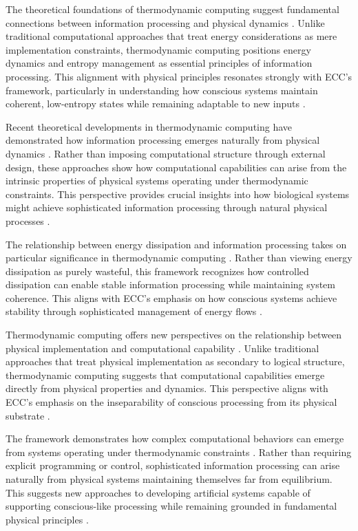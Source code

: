 \begin{refsection}
The theoretical foundations of thermodynamic computing suggest fundamental connections between information processing and physical dynamics \cite{Boyd2020}. Unlike traditional computational approaches that treat energy considerations as mere implementation constraints, thermodynamic computing positions energy dynamics and entropy management as essential principles of information processing. This alignment with physical principles resonates strongly with ECC's framework, particularly in understanding how conscious systems maintain coherent, low-entropy states while remaining adaptable to new inputs \cite{England2018}.

Recent theoretical developments in thermodynamic computing have demonstrated how information processing emerges naturally from physical dynamics \cite{Ganesh2021}. Rather than imposing computational structure through external design, these approaches show how computational capabilities can arise from the intrinsic properties of physical systems operating under thermodynamic constraints. This perspective provides crucial insights into how biological systems might achieve sophisticated information processing through natural physical processes \cite{Hinrichsen2019}.

The relationship between energy dissipation and information processing takes on particular significance in thermodynamic computing \cite{Kolchinsky2020}. Rather than viewing energy dissipation as purely wasteful, this framework recognizes how controlled dissipation can enable stable information processing while maintaining system coherence. This aligns with ECC's emphasis on how conscious systems achieve stability through sophisticated management of energy flows \cite{Maroney2019}.

Thermodynamic computing offers new perspectives on the relationship between physical implementation and computational capability \cite{Parrondo2017}. Unlike traditional approaches that treat physical implementation as secondary to logical structure, thermodynamic computing suggests that computational capabilities emerge directly from physical properties and dynamics. This perspective aligns with ECC's emphasis on the inseparability of conscious processing from its physical substrate \cite{Perunov2020}.

The framework demonstrates how complex computational behaviors can emerge from systems operating under thermodynamic constraints \cite{Sagawa2018}. Rather than requiring explicit programming or control, sophisticated information processing can arise naturally from physical systems maintaining themselves far from equilibrium. This suggests new approaches to developing artificial systems capable of supporting conscious-like processing while remaining grounded in fundamental physical principles \cite{Still2020}.


\end{refsection}
